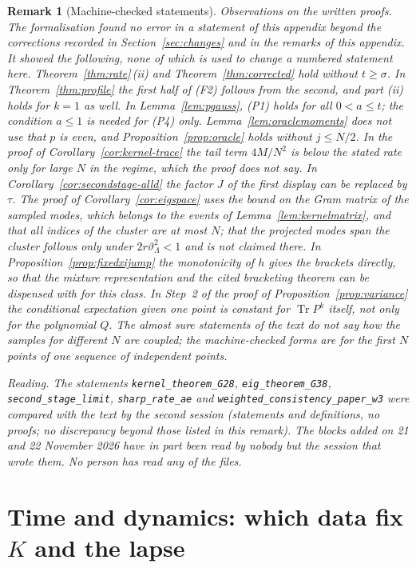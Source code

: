 \documentclass[11pt,a4paper]{article}
\theoremstyle{stmt}
\theoremstyle{defn}
\theoremstyle{rmk}
\newtheorem{remark}[theorem]{Remark}
\numberwithin{equation}{section}
\DeclareMathOperator{\Tr}{Tr}
\begin{document}
{\begin{remark}[Machine-checked statements]
\emph{Observations on the written proofs.} The formalisation found no error in a statement of this appendix beyond the corrections recorded in Section~\ref{sec:changes} and in the remarks of this appendix. It showed the following, none of which is used to change a numbered statement here. Theorem~\ref{thm:rate}\,(ii) and Theorem~\ref{thm:corrected} hold without $t\ge\sigma$. In Theorem~\ref{thm:profile} the first half of \textup{(F2)} follows from the second, and part (ii) holds for $k=1$ as well. In Lemma~\ref{lem:pgauss}, (P1) holds for all $0<a\le t$; the condition $a\le1$ is needed for (P4) only. Lemma~\ref{lem:oraclemoments} does not use that $p$ is even, and Proposition~\ref{prop:oracle} holds without $j\le N/2$. In the proof of Corollary~\ref{cor:kernel-trace} the tail term $4M/N^2$ is below the stated rate only for large $N$ in the regime, which the proof does not say. In Corollary~\ref{cor:secondstage-alld} the factor $J$ of the first display can be replaced by $\tau$. The proof of Corollary~\ref{cor:eigspace} uses the bound on the Gram matrix of the sampled modes, which belongs to the events of Lemma~\ref{lem:kernelmatrix}, and that all indices of the cluster are at most $N$; that the projected modes span the cluster follows only under $2r\vartheta_\Lambda^2<1$ and is not claimed there. In Proposition~\ref{prop:fixedxijump} the monotonicity of $h$ gives the brackets directly, so that the mixture representation and the cited bracketing theorem can be dispensed with for this class. In Step~2 of the proof of Proposition~\ref{prop:variance} the conditional expectation given one point is constant for $\Tr P^k$ itself, not only for the polynomial $Q$. The almost sure statements of the text do not say how the samples for different $N$ are coupled; the machine-checked forms are for the first $N$ points of one sequence of independent points.

\emph{Reading.} The statements \texttt{kernel\_theorem\_G28}, \texttt{eig\_theorem\_G38}, \texttt{second\_stage\_limit}, \texttt{sharp\_rate\_ae} and \texttt{weighted\_consistency\_paper\_w3} were compared with the text by the second session (statements and definitions, no proofs; no discrepancy beyond those listed in this remark). The blocks added on 21 and 22 November 2026 have in part been read by nobody but the session that wrote them. No person has read any of the files.

\end{remark}


\section{Time and dynamics: which data fix $K$ and the lapse}\label{app:time}

}
\end{document}
